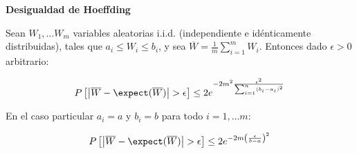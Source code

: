 \begin{lemma} \textbf{Desigualdad de Hoeffding}

 Sean $W_1, \ldots W_m$ variables aleatorias i.i.d. (independiente e idénticamente distribuidas), tales que 
 $a_i \le W_i \le b_i$, y sea $\overline{W} = \frac{1}{m} \sum_{i=1}^m W_i$. Entonces dado $\epsilon > 0$ arbitrario:

 \[P\left[\left| \overline{W} - \expect(\overline{W}) \right| > \epsilon \right] \le 2e^{-2m^2 \frac{\epsilon^2}{\sum_{i=1}^n (b_i-a_i)^2}}\]
 
 En el caso particular $a_i = a$ y $b_i = b$ para todo $i=1, \ldots m$:
 
 \[P\left[\left| \overline{W} - \expect(\overline{W}) \right| > \epsilon \right] \le 2e^{-2m \left(\frac{\epsilon}{b-a}\right)^2}\]
 
 
 \label{ineq:hoeffding}
\end{lemma}

